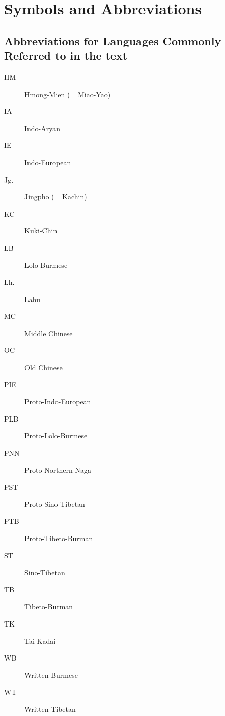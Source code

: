 \vspace{0.25em}

\renewcommand{\thefootnote}{\arabic{footnote}}
\setcounter{footnote}{0}

\chapter*{Symbols and Abbreviations}

\renewcommand\thefootnote{*}

\section*{Abbreviations for Languages Commonly Referred to in the text}
\begin{multicols}{2}
\begin{description}
\item[HM]	Hmong-Mien (= Miao-Yao)
\item[IA]	Indo-Aryan
\item[IE]	Indo-European
\item[Jg.]	Jingpho (= Kachin)
\item[KC]	Kuki-Chin
\item[LB]	Lolo-Burmese
\item[Lh.]	Lahu
\item[MC]	Middle Chinese
\item[OC]	Old Chinese
\item[PIE]	Proto-Indo-European
\item[PLB]	Proto-Lolo-Burmese
\item[PNN]	Proto-Northern Naga
\item[PST]	Proto-Sino-Tibetan
\item[PTB]	Proto-Tibeto-Burman
\item[ST]	Sino-Tibetan
\item[TB]	Tibeto-Burman
\item[TK]	Tai-Kadai
\item[WB]	Written Burmese
\item[WT]	Written Tibetan
\end{description}
\end{multicols}

